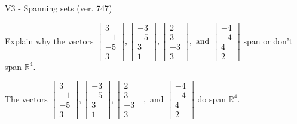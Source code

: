 \begin{exercise}
  \begin{exerciseTitle}V3 - Spanning sets (ver. 747)\end{exerciseTitle}
  \begin{exerciseStatement}
    Explain why the vectors \(\left[\begin{array}{r}
3 \\
-1 \\
-5 \\
3
\end{array}\right] , \left[\begin{array}{r}
-3 \\
-5 \\
3 \\
1
\end{array}\right] , \left[\begin{array}{r}
2 \\
3 \\
-3 \\
3
\end{array}\right] , \text{ and } \left[\begin{array}{r}
-4 \\
-4 \\
4 \\
2
\end{array}\right]\) span or don't span \(\mathbb{R}^4\). 
	


  \end{exerciseStatement}
  \begin{exerciseAnswer}
   The vectors \(\left[\begin{array}{r}
3 \\
-1 \\
-5 \\
3
\end{array}\right] , \left[\begin{array}{r}
-3 \\
-5 \\
3 \\
1
\end{array}\right] , \left[\begin{array}{r}
2 \\
3 \\
-3 \\
3
\end{array}\right] , \text{ and } \left[\begin{array}{r}
-4 \\
-4 \\
4 \\
2
\end{array}\right]\) 
  	 do  
	span \(\mathbb{R}^4\).
  


  \end{exerciseAnswer}
\end{exercise}